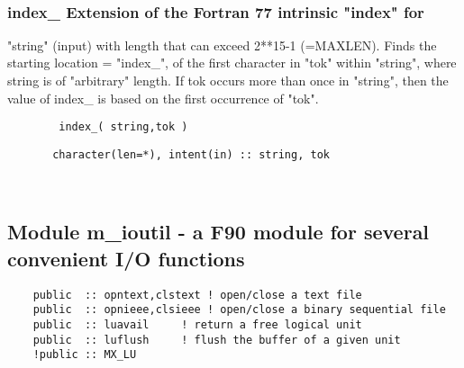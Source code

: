  
\mbox{}\hrulefill\ 

  \subsubsection{index\_ Extension of the Fortran 77 intrinsic "index" for }

    "string" (input) with length that can exceed 2**15-1 (=MAXLEN).  
  Finds the starting location = "index\_", of the first character in "tok"  
    within "string", where string is of "arbitrary" length.  If tok occurs more than
    once in "string", then the value of index\_ is based on the first occurrence of "tok". 
  
\begin{verbatim}        index_( string,tok )\end{verbatim}
\begin{verbatim}       character(len=*), intent(in) :: string, tok\end{verbatim}%


 
 
\mbox{}\hrulefill\ 

  \subsection{Module m\_ioutil - a F90 module for several convenient I/O functions }
%
  
\begin{verbatim} 
 	public	:: opntext,clstext ! open/close a text file
 	public	:: opnieee,clsieee ! open/close a binary sequential file
 	public	:: luavail	   ! return a free logical unit
 	public	:: luflush	   ! flush the buffer of a given unit
 	!public	:: MX_LU
 \end{verbatim}%
% 
 
